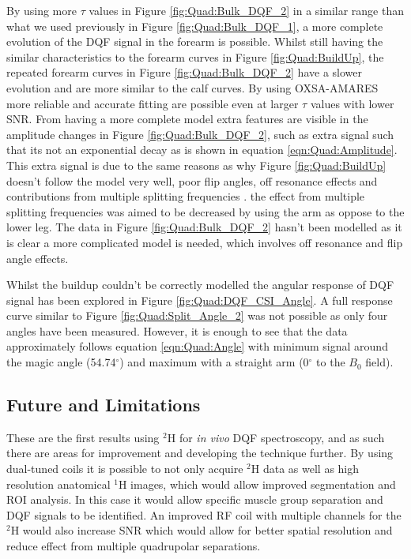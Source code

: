 By using more $\tau$ values in Figure \ref{fig:Quad:Bulk_DQF_2} in a similar range than what we used previously in Figure \ref{fig:Quad:Bulk_DQF_1}, a more complete evolution of the \ac{DQF} signal in the forearm is possible. Whilst still having the similar characteristics to the forearm curves in Figure \ref{fig:Quad:BuildUp}, the repeated forearm curves in Figure \ref{fig:Quad:Bulk_DQF_2} have a slower evolution and are more similar to the calf curves. By using OXSA-AMARES \cite{Purvis2017OXSA:MATLAB} more reliable and accurate fitting are possible even at larger $\tau$ values with lower SNR. From having a more complete model extra features are visible in the amplitude changes in Figure \ref{fig:Quad:Bulk_DQF_2}, such as extra signal such that its not an exponential decay as is shown in equation \ref{eqn:Quad:Amplitude}. This extra signal is due to the same reasons as why Figure \ref{fig:Quad:BuildUp} doesn't follow the model very well, poor flip angles, off resonance effects and contributions from multiple splitting frequencies \cite{Sharf1995DetectionNMR-Spectroscopy}. the effect from multiple splitting frequencies was aimed to be decreased by using the arm as oppose to the lower leg. The data in Figure \ref{fig:Quad:Bulk_DQF_2} hasn't been modelled as it is clear a more complicated model is needed, which involves off resonance and flip angle effects.

Whilst the buildup couldn't be correctly modelled the angular response of \ac{DQF} signal has been explored in Figure \ref{fig:Quad:DQF_CSI_Angle}. A full response curve similar to Figure \ref{fig:Quad:Split_Angle_2} was not possible as only four angles have been measured. However, it is enough to see that the data approximately follows equation \ref{eqn:Quad:Angle} with minimum signal around the magic angle (54.74$^\circ$) and maximum with a straight arm (0$^\circ$ to the $B_0$ field).

\subsection{Future and Limitations}

These are the first results using $^2$H for \textit{in vivo} \ac{DQF} spectroscopy, and as such there are areas for improvement and developing the technique further. By using dual-tuned coils it is possible to not only acquire $^2$H data as well as high resolution anatomical $^1$H images, which would allow improved segmentation and \ac{ROI} analysis. In this case it would allow specific muscle group separation and \ac{DQF} signals to be identified. An improved \ac{RF} coil with multiple channels for the $^2$H would also increase \ac{SNR} which would allow for better spatial resolution and reduce effect from multiple quadrupolar separations.

